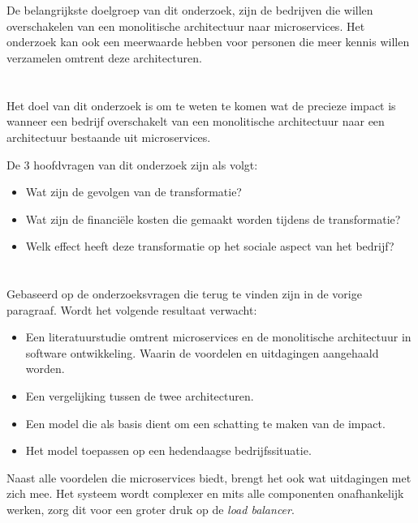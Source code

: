 \section{}
\label{sec:probleemstelling}

De belangrijkste doelgroep van dit onderzoek, zijn de bedrijven die willen overschakelen van een monolitische architectuur naar microservices. Het onderzoek kan ook een meerwaarde hebben voor personen die meer kennis willen verzamelen omtrent deze architecturen. 

\section{}
\label{sec:onderzoeksvraag}

Het doel van dit onderzoek is om te weten te komen wat de precieze impact is wanneer een bedrijf overschakelt van een monolitische architectuur naar een architectuur bestaande uit microservices.

De 3 hoofdvragen van dit onderzoek zijn als volgt:
\begin{itemize}
    \item Wat zijn de gevolgen van de transformatie?
    \item Wat zijn de financiële kosten die gemaakt worden tijdens de transformatie?
    \item Welk effect heeft deze transformatie op het sociale aspect van het bedrijf?
\end{itemize}

\section{}
\label{sec:onderzoeksdoelstelling}

Gebaseerd op de onderzoeksvragen die terug te vinden zijn in de vorige paragraaf. Wordt het volgende resultaat verwacht:

\begin{itemize}
    \item Een literatuurstudie omtrent microservices en de monolitische architectuur in software ontwikkeling. Waarin de voordelen en uitdagingen aangehaald worden.
    \item Een vergelijking tussen de twee architecturen. 
    \item Een model die als basis dient om een schatting te maken van de impact.
    \item Het model toepassen op een hedendaagse bedrijfssituatie.
\end{itemize}
Naast alle voordelen die microservices biedt, brengt het ook wat uitdagingen met zich mee. Het systeem wordt complexer en mits alle componenten onafhankelijk werken, zorg dit voor een groter druk op de \emph{load balancer}.

